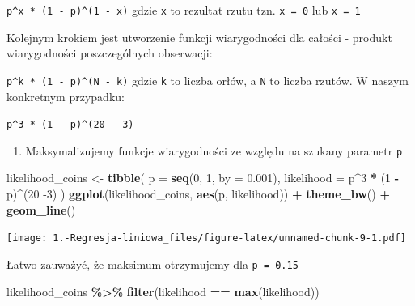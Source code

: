 \documentclass[
]{article}
\newenvironment{Shaded}{\begin{snugshade}}{\end{snugshade}}
\newcommand{\DataTypeTok}[1]{\textcolor[rgb]{0.13,0.29,0.53}{#1}}
\newcommand{\DecValTok}[1]{\textcolor[rgb]{0.00,0.00,0.81}{#1}}
\newcommand{\FloatTok}[1]{\textcolor[rgb]{0.00,0.00,0.81}{#1}}
\newcommand{\KeywordTok}[1]{\textcolor[rgb]{0.13,0.29,0.53}{\textbf{#1}}}
\newcommand{\NormalTok}[1]{#1}
\newcommand{\OperatorTok}[1]{\textcolor[rgb]{0.81,0.36,0.00}{\textbf{#1}}}
\newcommand{\StringTok}[1]{\textcolor[rgb]{0.31,0.60,0.02}{#1}}
\providecommand{\tightlist}{%
  \setlength{\itemsep}{0pt}\setlength{\parskip}{0pt}}
\begin{document}
\texttt{p\^{}x\ *\ (1\ -\ p)\^{}(1\ -\ x)} gdzie \texttt{x} to rezultat
rzutu tzn. \texttt{x\ =\ 0} lub \texttt{x\ =\ 1}

Kolejnym krokiem jest utworzenie funkcji wiarygodności dla całości -
produkt wiarygodności poszczególnych obserwacji:

\texttt{p\^{}k\ *\ (1\ -\ p)\^{}(N\ -\ k)} gdzie \texttt{k} to liczba
orłów, a \texttt{N} to liczba rzutów. W naszym konkretnym przypadku:

\texttt{p\^{}3\ *\ (1\ -\ p)\^{}(20\ -\ 3)}

\begin{enumerate}
\def\labelenumi{\arabic{enumi}.}
\setcounter{enumi}{1}
\tightlist
\item
  Maksymalizujemy funkcje wiarygodności ze względu na szukany parametr
  \texttt{p}
\end{enumerate}

\begin{Shaded}
\begin{Highlighting}[]
\NormalTok{likelihood\_coins \textless{}{-}}\StringTok{ }\KeywordTok{tibble}\NormalTok{(}
  \DataTypeTok{p =} \KeywordTok{seq}\NormalTok{(}\DecValTok{0}\NormalTok{, }\DecValTok{1}\NormalTok{, }\DataTypeTok{by =} \FloatTok{0.001}\NormalTok{),}
  \DataTypeTok{likelihood =}\NormalTok{ p}\OperatorTok{\^{}}\DecValTok{3} \OperatorTok{*}\StringTok{ }\NormalTok{(}\DecValTok{1} \OperatorTok{{-}}\StringTok{ }\NormalTok{p)}\OperatorTok{\^{}}\NormalTok{(}\DecValTok{20} \DecValTok{{-}3}\NormalTok{)}
\NormalTok{)}
\KeywordTok{ggplot}\NormalTok{(likelihood\_coins, }\KeywordTok{aes}\NormalTok{(p, likelihood)) }\OperatorTok{+}\StringTok{ }\KeywordTok{theme\_bw}\NormalTok{() }\OperatorTok{+}\StringTok{ }\KeywordTok{geom\_line}\NormalTok{()}
\end{Highlighting}
\end{Shaded}

\texttt{[image: 1.-Regresja-liniowa\_files/figure-latex/unnamed-chunk-9-1.pdf]}

Łatwo zauważyć, że maksimum otrzymujemy dla \texttt{p\ =\ 0.15}

\begin{Shaded}
\begin{Highlighting}[]
\NormalTok{likelihood\_coins }\OperatorTok{\%\textgreater{}\%}\StringTok{ }\KeywordTok{filter}\NormalTok{(likelihood }\OperatorTok{==}\StringTok{ }\KeywordTok{max}\NormalTok{(likelihood))}
\end{Highlighting}
\end{Shaded}
\end{document}
